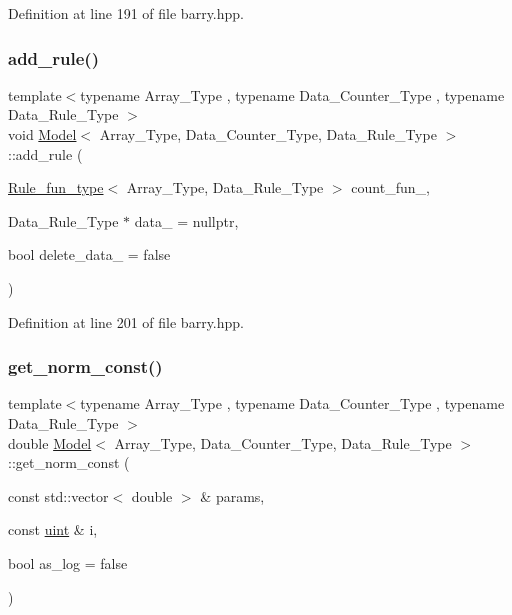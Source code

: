 Definition at line 191 of file barry.\+hpp.

\mbox{\label{classbarry_1_1_model_af3a1a343dfff4f40443bee4ddf76a0ba}} 
\subsubsection{\texorpdfstring{add\+\_\+rule()}{add\_rule()}\hspace{0.1cm}{\footnotesize\ttfamily [3/3]}}
{\footnotesize\ttfamily template$<$typename Array\+\_\+\+Type , typename Data\+\_\+\+Counter\+\_\+\+Type , typename Data\+\_\+\+Rule\+\_\+\+Type $>$ \\
void \hyperlink{classbarry_1_1_model}{Model}$<$ Array\+\_\+\+Type, Data\+\_\+\+Counter\+\_\+\+Type, Data\+\_\+\+Rule\+\_\+\+Type $>$\+::add\+\_\+rule (\begin{DoxyParamCaption}\item[{\hyperlink{namespacebarry_a3b914cb0dafdd5e5c19d142e8fa96c92}{Rule\+\_\+fun\+\_\+type}$<$ Array\+\_\+\+Type, Data\+\_\+\+Rule\+\_\+\+Type $>$}]{count\+\_\+fun\+\_\+,  }\item[{Data\+\_\+\+Rule\+\_\+\+Type $\ast$}]{data\+\_\+ = {\ttfamily nullptr},  }\item[{bool}]{delete\+\_\+data\+\_\+ = {\ttfamily false} }\end{DoxyParamCaption})\hspace{0.3cm}{\ttfamily [inline]}}



Definition at line 201 of file barry.\+hpp.

\mbox{\label{classbarry_1_1_model_a8de55fd86cdca46936e455721754a2af}} 
\subsubsection{\texorpdfstring{get\+\_\+norm\+\_\+const()}{get\_norm\_const()}}
{\footnotesize\ttfamily template$<$typename Array\+\_\+\+Type , typename Data\+\_\+\+Counter\+\_\+\+Type , typename Data\+\_\+\+Rule\+\_\+\+Type $>$ \\
double \hyperlink{classbarry_1_1_model}{Model}$<$ Array\+\_\+\+Type, Data\+\_\+\+Counter\+\_\+\+Type, Data\+\_\+\+Rule\+\_\+\+Type $>$\+::get\+\_\+norm\+\_\+const (\begin{DoxyParamCaption}\item[{const std\+::vector$<$ double $>$ \&}]{params,  }\item[{const \hyperlink{namespacebarry_a11dfc53ddb4672278319aa04f1e09a6c}{uint} \&}]{i,  }\item[{bool}]{as\+\_\+log = {\ttfamily false} }\end{DoxyParamCaption})\hspace{0.3cm}{\ttfamily [inline]}}



